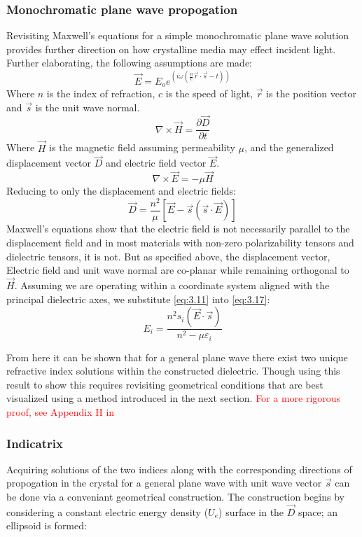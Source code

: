 \subsubsection{Monochromatic plane wave propogation}
Revisiting Maxwell's equations for a simple monochromatic plane wave solution provides further direction on how crystalline media may effect incident light. Further elaborating, the following assumptions are made:
\begin{equation}
\vec{E} = E_o e^{(i \omega (\frac{n}{c} \vec{r}\cdot \vec{s}-t))}
\end{equation}
Where $n$ is the index of refraction, $c$ is the speed of light, $\vec{r}$ is the position vector and $\vec{s}$ is the unit wave normal.
\begin{equation}
\nabla \times \vec{H}= \frac{\partial \vec{D}}{\partial t}
\end{equation}
Where $\vec{H}$ is the magnetic field assuming permeability $\mu$, and the generalized displacement vector $\vec{D}$ and electric field vector $\vec{E}$.
\begin{equation}
\nabla \times \vec{E} = -\mu \vec{H}
\end{equation}
Reducing to only the displacement and electric fields:
\begin{equation}\label{eq:3.17}
\vec{D} = \frac{n^2}{\mu}[\vec{E}-\vec{s}(\vec{s}\cdot \vec{E})]
\end{equation}
Maxwell's equations show that the electric field is not necessarily parallel to the displacement field and in most materials with non-zero polarizability tensors and dielectric tensors, it is not. But as specified above, the displacement vector, Electric field and unit wave normal are co-planar while remaining orthogonal to $\vec{H}$. Assuming we are operating within a coordinate system aligned with the principal dielectric axes, we substitute \ref{eq:3.11} into \ref{eq:3.17}:
\begin{equation}\label{eq:3.18}
E_i = \frac{n^2 s_i (\vec{E}\cdot\vec{s})}{n^2 - \mu \varepsilon_i}
\end{equation}

From here it can be shown that for a general plane wave there exist two unique refractive index solutions within the constructed dielectric. Though using this result to show this requires revisiting geometrical conditions that are best visualized using a method introduced in the next section. \textcolor{red}{For a more rigorous proof, see Appendix H in} \cite{nye}

\subsubsection{Indicatrix}\label{sec:indicatrix}
Acquiring solutions of the two indices along with the corresponding directions of propogation in the crystal for a general plane wave with unit wave vector $\vec{s}$ can be done via a conveniant geometrical construction. The construction begins by considering a constant electric energy density ($U_e$) surface in the $\vec{D}$ space; an ellipsoid is formed:

